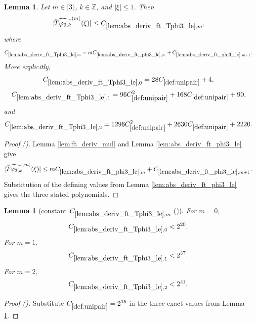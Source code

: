 \documentclass[12pt,reqno]{amsart}
\newcommand{\auto}{{({\tiny\faCar})}}
\theoremstyle{plain}
\newtheorem{lemma}[theorem]{Lemma}
\numberwithin{equation}{section}
\theoremstyle{remark}
\newcommand{\uses}[1]{}
\newcommand{\usesdefs}[1]{}
\newcommand{\Z}{{\mathbb Z}}
\begin{document}
\begin{lemma}\label{lem:abs_deriv_ft_Tphi3_le}\uses{lem:ft_deriv_mul,lem:abs_deriv_ft_phi3_le}\usesdefs{def:unipair,defn:window based bump functions}
Let $m\in[3)$, $k\in\Z$, and $|\xi|\le1$. Then
\begin{equation}\label{auto:T-varphi-three-Fourier-derivative-bound}
|\widehat{T\varphi_{3,k}}^{(m)}(\xi)|
\le C_{\ref{lem:abs_deriv_ft_Tphi3_le},m},
\end{equation}
where
\begin{equation}\label{auto:T-varphi-three-Fourier-derivative-constant}
C_{\ref{lem:abs_deriv_ft_Tphi3_le},m}
=mC_{\ref{lem:abs_deriv_ft_phi3_le},m}
+C_{\ref{lem:abs_deriv_ft_phi3_le},m+1}.
\end{equation}
More explicitly,
\begin{equation}\label{auto:T-varphi-three-Fourier-derivative-constant-zero-exact}
C_{\ref{lem:abs_deriv_ft_Tphi3_le},0}=28C_{\ref{def:unipair}}+4,
\end{equation}
\begin{equation}\label{auto:T-varphi-three-Fourier-derivative-constant-one-exact}
C_{\ref{lem:abs_deriv_ft_Tphi3_le},1}=96C_{\ref{def:unipair}}^2+168C_{\ref{def:unipair}}+90,
\end{equation}
and
\begin{equation}\label{auto:T-varphi-three-Fourier-derivative-constant-two-exact}
C_{\ref{lem:abs_deriv_ft_Tphi3_le},2}=1296C_{\ref{def:unipair}}^2+2630C_{\ref{def:unipair}}+2220.
\end{equation}
\end{lemma}
\begin{proof}[Proof \auto]
Lemma \ref{lem:ft_deriv_mul} and Lemma \ref{lem:abs_deriv_ft_phi3_le} give
\[
|\widehat{T\varphi_{3,k}}^{(m)}(\xi)|
\le
mC_{\ref{lem:abs_deriv_ft_phi3_le},m}
+C_{\ref{lem:abs_deriv_ft_phi3_le},m+1}.
\]
Substitution of the defining values from Lemma \ref{lem:abs_deriv_ft_phi3_le} gives the three stated polynomials.
\end{proof}

\begin{lemma}[constant $C_{\ref{lem:abs_deriv_ft_Tphi3_le},m}$ \auto]\label{constant T phi three derivative}\uses{lem:abs_deriv_ft_Tphi3_le}\usesdefs{def:unipair}
For $m=0$,
\begin{equation}\label{constant T phi three derivative bound}
C_{\ref{lem:abs_deriv_ft_Tphi3_le},0}<2^{20}.
\end{equation}
For $m=1$,
\begin{equation}\label{auto:constant-T-phi-three-derivative-one}
C_{\ref{lem:abs_deriv_ft_Tphi3_le},1}<2^{37}.
\end{equation}
For $m=2$,
\begin{equation}\label{auto:constant-T-phi-three-derivative-two}
C_{\ref{lem:abs_deriv_ft_Tphi3_le},2}<2^{41}.
\end{equation}
\end{lemma}
\begin{proof}[Proof \auto]
Substitute $C_{\ref{def:unipair}}=2^{15}$ in the three exact values from Lemma \ref{lem:abs_deriv_ft_Tphi3_le}.
\end{proof}
\end{document}
